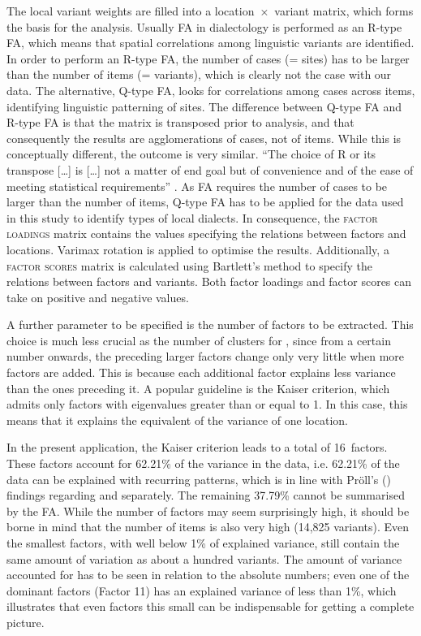 \documentclass[output=paper]{LSP/langsci}
\begin{document}
The local variant weights are filled into a location~×~variant matrix, which forms the basis for the analysis. Usually FA in dialectology is performed as an R-type FA, which means that spatial correlations among linguistic variants are identified. In order to perform an R-type FA, the number of cases (= sites) has to be larger than the number of items (= variants), which is clearly not the case with our data. The alternative, Q-type FA, looks for correlations among cases across items, identifying linguistic patterning of sites. The difference between Q-type FA and R-type FA is that the matrix is transposed prior to analysis, and that consequently the results are agglomerations of cases, not of items. While this is conceptually different, the outcome is very similar. “The choice of R or its transpose […] is […] not a matter of end goal but of convenience and of the ease of meeting statistical requirements” \citep[326]{cattell_scientific_1978}. As FA requires the number of cases to be larger than the number of items, Q-type FA has to be applied for the data used in this study to identify types of local dialects. In consequence, the \textsc{factor loadings} matrix contains the values specifying the relations between factors and locations. Varimax rotation is applied to optimise the results. Additionally, a \textsc{factor scores} matrix is calculated using Bartlett’s method to specify the relations between factors and variants. Both factor loadings and factor scores can take on positive and negative values.

A further parameter to be specified is the number of factors to be extracted. This choice is much less crucial as the number of clusters for , since from a certain number onwards, the preceding larger factors change only very little when more factors are added. This is because each additional factor explains less variance than the ones preceding it. A popular guideline is the Kaiser criterion, which admits only factors with eigenvalues greater than or equal to 1. In this case, this means that it explains the equivalent of the variance of one location.

In the present application, the Kaiser criterion leads to a total of 16~factors. These factors account for 62.21\% of the variance in the data, i.e. 62.21\% of the data can be explained with recurring patterns, which is in line with Pröll’s (\citeyear{proll_raumvariation_2015}) findings regarding  and  separately. The remaining 37.79\% cannot be summarised by the FA. While the number of factors may seem surprisingly high, it should be borne in mind that the number of items is also very high (14,825 variants). Even the smallest factors, with well below 1\% of explained variance, still contain the same amount of variation as about a hundred variants. The amount of variance accounted for has to be seen in relation to the absolute numbers; even one of the dominant factors (Factor 11) has an explained variance of less than 1\%, which illustrates that even factors this small can be indispensable for getting a complete picture. 
\end{document}
